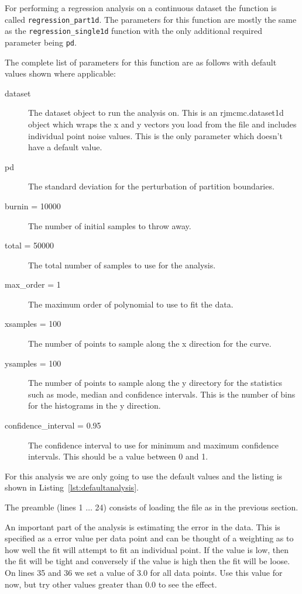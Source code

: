 \documentclass{tufte-handout}
\begin{document}
For performing a regression analysis on a continuous dataset the
function is called {\tt regression\_part1d}. The parameters for this
function are mostly the same as the {\tt regression\_single1d}
function with the only additional required parameter being {\tt pd}.

The complete list of parameters for this function are as follows with
default values shown where applicable:

\begin{description}
\item[dataset] The dataset object to run the analysis on. This is an
  rjmcmc.dataset1d object which wraps the x and y vectors you load
  from the file and includes individual point noise values. This is
  the only parameter which doesn't have a default value.
\item[pd] The standard deviation for the perturbation of partition
  boundaries.
\item[burnin = 10000] The number of initial samples to throw away.
\item[total = 50000] The total number of samples to use for the
  analysis.
\item[max\_order = 1] The maximum order of polynomial to use to fit
  the data.
\item[xsamples = 100] The number of points to sample along the x
  direction for the curve.
\item[ysamples = 100] The number of points to sample along the y
  directory for the statistics such as mode, median and confidence
  intervals. This is the number of bins for the histograms in the y
  direction.
\item[confidence\_interval = 0.95] The confidence interval to use for
  minimum and maximum confidence intervals. This should be a value
  between 0 and 1.
\end{description}

For this analysis we are only going to use the default values and the
listing is shown in Listing~\ref{lst:defaultanalysis}.

\lstset{caption=Running the Default Analysis,label=lst:defaultanalysis}


The preamble (lines 1 $\ldots$ 24) consists of loading the file as in
the previous section.

An important part of the analysis is estimating the error in the data.
This is specified as a error value per data point and can be thought
of a weighting as to how well the fit will attempt to fit an
individual point. If the value is low, then the fit will be tight and
conversely if the value is high then the fit will be loose. On lines
35 and 36 we set a value of 3.0 for all data points.  Use this value
for now, but try other values greater than 0.0 to see the effect.
\end{document}
